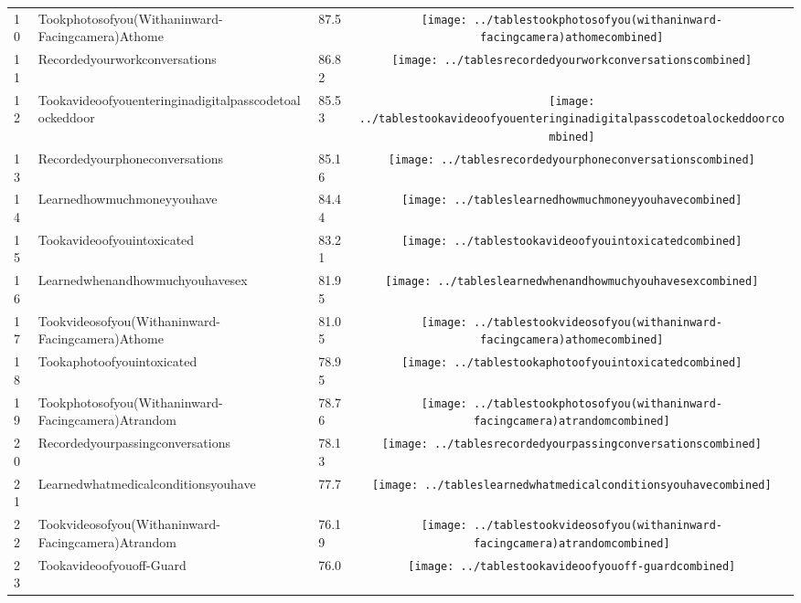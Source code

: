 \documentclass[a4paper,12pt]{article}
\begin{document}
\begin{longtable}{| p{0.5cm} | p{7cm} | p{1cm} | c |}
10 & Tookphotosofyou(Withaninward-Facingcamera)Athome & 87.5 & \texttt{[image: ../tablestookphotosofyou(withaninward-facingcamera)athomecombined]} \\ 
11 & Recordedyourworkconversations & 86.82 & \texttt{[image: ../tablesrecordedyourworkconversationscombined]} \\ 
12 & Tookavideoofyouenteringinadigitalpasscodetoalockeddoor & 85.53 & \texttt{[image: ../tablestookavideoofyouenteringinadigitalpasscodetoalockeddoorcombined]} \\ 
13 & Recordedyourphoneconversations & 85.16 & \texttt{[image: ../tablesrecordedyourphoneconversationscombined]} \\ 
14 & Learnedhowmuchmoneyyouhave & 84.44 & \texttt{[image: ../tableslearnedhowmuchmoneyyouhavecombined]} \\ 
15 & Tookavideoofyouintoxicated & 83.21 & \texttt{[image: ../tablestookavideoofyouintoxicatedcombined]} \\ 
16 & Learnedwhenandhowmuchyouhavesex & 81.95 & \texttt{[image: ../tableslearnedwhenandhowmuchyouhavesexcombined]} \\ 
17 & Tookvideosofyou(Withaninward-Facingcamera)Athome & 81.05 & \texttt{[image: ../tablestookvideosofyou(withaninward-facingcamera)athomecombined]} \\ 
18 & Tookaphotoofyouintoxicated & 78.95 & \texttt{[image: ../tablestookaphotoofyouintoxicatedcombined]} \\ 
19 & Tookphotosofyou(Withaninward-Facingcamera)Atrandom & 78.76 & \texttt{[image: ../tablestookphotosofyou(withaninward-facingcamera)atrandomcombined]} \\ 
20 & Recordedyourpassingconversations & 78.13 & \texttt{[image: ../tablesrecordedyourpassingconversationscombined]} \\ 
21 & Learnedwhatmedicalconditionsyouhave & 77.7 & \texttt{[image: ../tableslearnedwhatmedicalconditionsyouhavecombined]} \\ 
22 & Tookvideosofyou(Withaninward-Facingcamera)Atrandom & 76.19 & \texttt{[image: ../tablestookvideosofyou(withaninward-facingcamera)atrandomcombined]} \\ 
23 & Tookavideoofyouoff-Guard & 76.0 & \texttt{[image: ../tablestookavideoofyouoff-guardcombined]} \\ 

\end{longtable}
\end{document}
